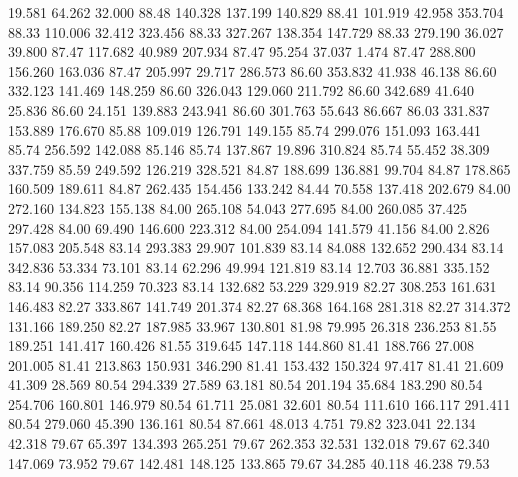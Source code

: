   19.581   64.262   32.000        88.48
 140.328  137.199  140.829        88.41
 101.919   42.958  353.704        88.33
 110.006   32.412  323.456        88.33
 327.267  138.354  147.729        88.33
 279.190   36.027   39.800        87.47
 117.682   40.989  207.934        87.47
  95.254   37.037    1.474        87.47
 288.800  156.260  163.036        87.47
 205.997   29.717  286.573        86.60
 353.832   41.938   46.138        86.60
 332.123  141.469  148.259        86.60
 326.043  129.060  211.792        86.60
 342.689   41.640   25.836        86.60
  24.151  139.883  243.941        86.60
 301.763   55.643   86.667        86.03
 331.837  153.889  176.670        85.88
 109.019  126.791  149.155        85.74
 299.076  151.093  163.441        85.74
 256.592  142.088   85.146        85.74
 137.867   19.896  310.824        85.74
  55.452   38.309  337.759        85.59
 249.592  126.219  328.521        84.87
 188.699  136.881   99.704        84.87
 178.865  160.509  189.611        84.87
 262.435  154.456  133.242        84.44
  70.558  137.418  202.679        84.00
 272.160  134.823  155.138        84.00
 265.108   54.043  277.695        84.00
 260.085   37.425  297.428        84.00
  69.490  146.600  223.312        84.00
 254.094  141.579   41.156        84.00
   2.826  157.083  205.548        83.14
 293.383   29.907  101.839        83.14
  84.088  132.652  290.434        83.14
 342.836   53.334   73.101        83.14
  62.296   49.994  121.819        83.14
  12.703   36.881  335.152        83.14
  90.356  114.259   70.323        83.14
 132.682   53.229  329.919        82.27
 308.253  161.631  146.483        82.27
 333.867  141.749  201.374        82.27
  68.368  164.168  281.318        82.27
 314.372  131.166  189.250        82.27
 187.985   33.967  130.801        81.98
  79.995   26.318  236.253        81.55
 189.251  141.417  160.426        81.55
 319.645  147.118  144.860        81.41
 188.766   27.008  201.005        81.41
 213.863  150.931  346.290        81.41
 153.432  150.324   97.417        81.41
  21.609   41.309   28.569        80.54
 294.339   27.589   63.181        80.54
 201.194   35.684  183.290        80.54
 254.706  160.801  146.979        80.54
  61.711   25.081   32.601        80.54
 111.610  166.117  291.411        80.54
 279.060   45.390  136.161        80.54
  87.661   48.013    4.751        79.82
 323.041   22.134   42.318        79.67
  65.397  134.393  265.251        79.67
 262.353   32.531  132.018        79.67
  62.340  147.069   73.952        79.67
 142.481  148.125  133.865        79.67
  34.285   40.118   46.238        79.53
